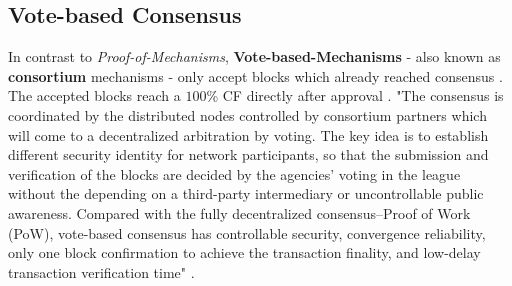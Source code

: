 \subsection{Vote-based Consensus}
\label{sec:VbC}
In contrast to \textit{Proof-of-Mechanisms}, \textbf{Vote-based-Mechanisms} - also
known as \textbf{consortium} mechanisms - only accept blocks which already reached consensus \cite[3]{Angelis.2018}. 
The accepted blocks reach a $100$\% \gls{CF} directly after approval \cite[3]{Angelis.2018}.
"The consensus is coordinated by the distributed nodes controlled by consortium partners which will come to a decentralized arbitration by voting. The key idea is to establish different security identity for network participants, so that the submission and verification of the blocks are decided by the agencies’ voting in the league without the depending on a third-party intermediary or uncontrollable public awareness. Compared with the fully decentralized consensus–Proof of Work (\gls{PoW}), vote-based consensus has controllable security, convergence reliability, only one block confirmation to achieve the transaction finality, and low-delay transaction verification time" \cite[466]{Kejiao.2017}. \\

